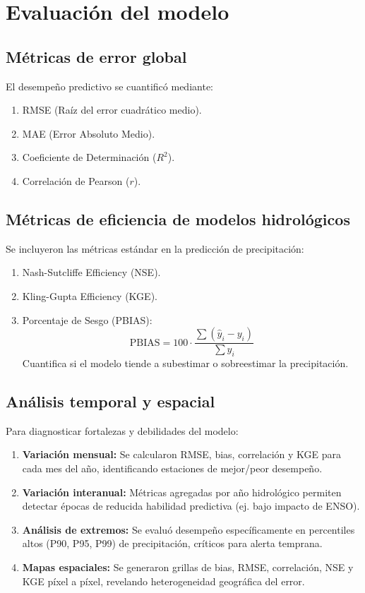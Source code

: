 \section{Evaluación del modelo}
\label{sec:evaluacion_modelo}

\subsection{Métricas de error global}
El desempeño predictivo se cuantificó mediante:

\begin{enumerate}
    \item RMSE (Raíz del error cuadrático medio).
    \item MAE (Error Absoluto Medio).
    \item Coeficiente de Determinación ($R^2$).
    \item Correlación de Pearson ($r$).
\end{enumerate}

\subsection{Métricas de eficiencia de modelos hidrológicos}
Se incluyeron las métricas estándar en la predicción de precipitación:

\begin{enumerate}
    \item Nash-Sutcliffe Efficiency (NSE).
    \item Kling-Gupta Efficiency (KGE). 
    \item Porcentaje de Sesgo (PBIAS):
    \begin{equation}
        \text{PBIAS} = 100 \cdot \frac{\sum (\hat{y}_i - y_i)}{\sum y_i}
    \end{equation}
    Cuantifica si el modelo tiende a subestimar o sobreestimar la precipitación.
\end{enumerate}

\subsection{Análisis temporal y espacial}
Para diagnosticar fortalezas y debilidades del modelo:

\begin{enumerate}
    \item \textbf{Variación mensual:} Se calcularon RMSE, bias, correlación y KGE para cada mes del año, identificando estaciones de mejor/peor desempeño.
    \item \textbf{Variación interanual:} Métricas agregadas por año hidrológico permiten detectar épocas de reducida habilidad predictiva (ej. bajo impacto de ENSO).
    \item \textbf{Análisis de extremos:} Se evaluó desempeño específicamente en percentiles altos (P90, P95, P99) de precipitación, críticos para alerta temprana.
    \item \textbf{Mapas espaciales:} Se generaron grillas de bias, RMSE, correlación, NSE y KGE píxel a píxel, revelando heterogeneidad geográfica del error.
\end{enumerate}

